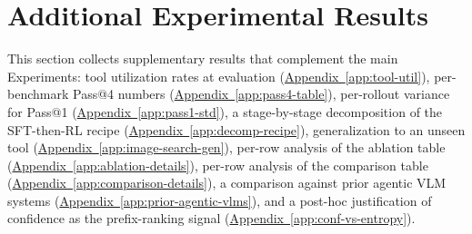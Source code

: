 \documentclass{llmxive}
\providecommand{\appref}[1]{\hyperref[#1]{Appendix~\ref*{#1}}}
\begin{document}
\section{Additional Experimental Results}
\label{app:additional-results}

This section collects supplementary results that complement the main Experiments: tool utilization rates at evaluation (\appref{app:tool-util}), per-benchmark Pass@4 numbers (\appref{app:pass4-table}), per-rollout variance for Pass@1 (\appref{app:pass1-std}), a stage-by-stage decomposition of the SFT-then-RL recipe (\appref{app:decomp-recipe}), generalization to an unseen tool (\appref{app:image-search-gen}), per-row analysis of the ablation table (\appref{app:ablation-details}), per-row analysis of the comparison table (\appref{app:comparison-details}), a comparison against prior agentic VLM systems (\appref{app:prior-agentic-vlms}), and a post-hoc justification of confidence as the prefix-ranking signal (\appref{app:conf-vs-entropy}).
\end{document}
